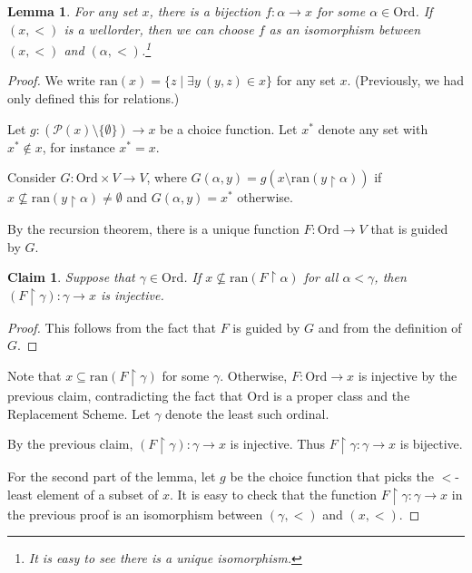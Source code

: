\documentclass[a4paper, 11pt]{amsart}
\newtheorem{lemma}[lemma]{Lemma}
\newtheorem*{claim*}{Claim}
\theoremstyle{remark}
\newcommand{\Ord}{\mathrm{Ord}}
\newcommand{\ran}{\mathrm{ran}}
\newcommand{\pow}{\mathcal{P}}
\begin{document}
\begin{lemma} 
\label{existence of cardinality of a set} 
For any set $x$, there is a bijection $f\colon \alpha\rightarrow x$ for some $\alpha\in \Ord$. 
If $(x,<)$ is a wellorder, then we can choose $f$ as an isomorphism between $(x,<)$ and $(\alpha,<)$.\footnote{It is easy to see there is a unique isomorphism.} 
\end{lemma} 
\begin{proof} 
We write $\ran(x)=\{ z\mid \exists y\ (y,z)\in x\} $ for any set $x$. (Previously, we had only defined this for relations.) 

Let $g\colon (\pow(x)\setminus \{\emptyset\})\rightarrow x$ be a choice function. 
Let $x^*$ denote any set with $x^*\notin x$, for instance $x^*=x$. 

Consider $G\colon \Ord \times V \rightarrow V$, where $G(\alpha,y)=g(x\setminus\ran(y{\upharpoonright}\alpha))$ if $x \not\subseteq\ran(y{\upharpoonright}\alpha) \neq \emptyset$ and $G(\alpha,y)=x^*$ otherwise. 

By the recursion theorem, there is a unique function $F\colon \Ord\rightarrow V$ that is guided by $G$. 

\begin{claim*} 
Suppose that $\gamma\in \Ord$. 
If $x\not\subseteq\ran(F{\upharpoonright}\alpha)$ for all $\alpha<\gamma$, then $(F{\upharpoonright}\gamma)\colon \gamma\rightarrow x$ is injective. 
\end{claim*} 
\begin{proof} 
This follows from the fact that $F$ is guided by $G$ and from the definition of $G$. 
\end{proof} 

Note that $x\subseteq \ran(F{\upharpoonright}\gamma)$ for some $\gamma$. 
Otherwise, $F\colon \Ord \rightarrow x$ is injective by the previous claim, contradicting the fact that $\Ord$ is a proper class and the Replacement Scheme. 
Let $\gamma$ denote the least such ordinal. 

By the previous claim, $(F{\upharpoonright}\gamma)\colon \gamma\rightarrow x$ is injective. 
Thus $F{\upharpoonright}\gamma\colon \gamma\rightarrow x$ is bijective. 

For the second part of the lemma, let $g$ be the choice function that picks the $<$-least element of a subset of $x$. 
It is easy to check that the function  $F{\upharpoonright}\gamma\colon \gamma\rightarrow x$ in the previous proof is an isomorphism between $(\gamma,<)$ and $(x,<)$. 
\end{proof} 
\end{document}
